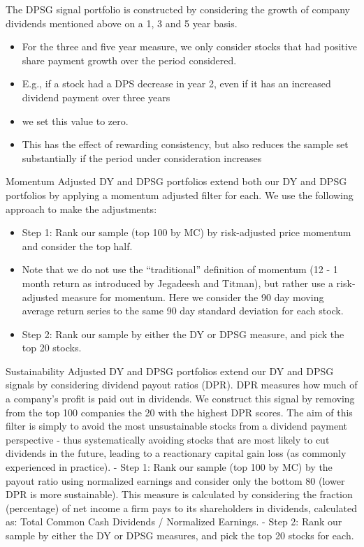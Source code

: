 \documentclass[11pt,preprint, authoryear]{elsarticle}
\numberwithin{equation}{section}
\numberwithin{figure}{section}
\numberwithin{table}{section}
\def\tightlist{} %
\begin{document}
The DPSG signal portfolio is constructed by considering the growth of
company dividends mentioned above on a 1, 3 and 5 year basis.

\begin{itemize}
\tightlist
\item
  For the three and five year measure, we only consider stocks that had
  positive share payment growth over the period considered.
\item
  E.g., if a stock had a DPS decrease in year 2, even if it has an
  increased dividend payment over three years
\item
  we set this value to zero.
\item
  This has the effect of rewarding consistency, but also reduces the
  sample set substantially if the period under consideration increases
\end{itemize}

Momentum Adjusted DY and DPSG portfolios extend both our DY and DPSG
portfolios by applying a momentum adjusted filter for each. We use the
following approach to make the adjustments:

\begin{itemize}
\tightlist
\item
  Step 1: Rank our sample (top 100 by MC) by risk-adjusted price
  momentum and consider the top half.
\item
  Note that we do not use the ``traditional'' definition of momentum (12
  - 1 month return as introduced by Jegadeesh and Titman), but rather
  use a risk-adjusted measure for momentum. Here we consider the 90 day
  moving average return series to the same 90 day standard deviation for
  each stock.
\item
  Step 2: Rank our sample by either the DY or DPSG measure, and pick the
  top 20 stocks.
\end{itemize}

Sustainability Adjusted DY and DPSG portfolios extend our DY and DPSG
signals by considering dividend payout ratios (DPR). DPR measures how
much of a company's profit is paid out in dividends. We construct this
signal by removing from the top 100 companies the 20 with the highest
DPR scores. The aim of this filter is simply to avoid the most
unsustainable stocks from a dividend payment perspective - thus
systematically avoiding stocks that are most likely to cut dividends in
the future, leading to a reactionary capital gain loss (as commonly
experienced in practice). - Step 1: Rank our sample (top 100 by MC) by
the payout ratio using normalized earnings and consider only the bottom
80 (lower DPR is more sustainable). This measure is calculated by
considering the fraction (percentage) of net income a firm pays to its
shareholders in dividends, calculated as: Total Common Cash Dividends /
Normalized Earnings. - Step 2: Rank our sample by either the DY or DPSG
measures, and pick the top 20 stocks for each.
\end{document}
